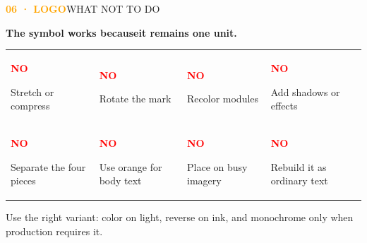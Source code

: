 \documentclass[a4paper,10pt]{article}
\newcommand{\PageLabel}[2]{\noindent\textcolor{orange}{\footnotesize\bfseries #1}\hfill\textcolor{ink!55}{\footnotesize #2}\par\vspace{5mm}}
\newcommand{\Title}[1]{{\displayfont\bfseries\fontsize{34}{38}\selectfont\color{ink}#1\par}}
\newcommand{\Sub}[1]{{\fontsize{13}{19}\selectfont\color{ink!75}#1\par}}
\begin{document}
\PageLabel{06 · LOGO}{WHAT NOT TO DO}
\Title{The symbol works because\newline it remains one unit.}
\vspace{8mm}
\begin{tabularx}{\textwidth}{@{}Y Y Y Y@{}}
\begin{card}\textcolor{red}{\bfseries NO}\par\small Stretch or compress\end{card}&
\begin{card}\textcolor{red}{\bfseries NO}\par\small Rotate the mark\end{card}&
\begin{card}\textcolor{red}{\bfseries NO}\par\small Recolor modules\end{card}&
\begin{card}\textcolor{red}{\bfseries NO}\par\small Add shadows or effects\end{card}\\[5mm]
\begin{card}\textcolor{red}{\bfseries NO}\par\small Separate the four pieces\end{card}&
\begin{card}\textcolor{red}{\bfseries NO}\par\small Use orange for body text\end{card}&
\begin{card}\textcolor{red}{\bfseries NO}\par\small Place on busy imagery\end{card}&
\begin{card}\textcolor{red}{\bfseries NO}\par\small Rebuild it as ordinary text\end{card}
\end{tabularx}
\vfill\Sub{Use the right variant: color on light, reverse on ink, and monochrome only when production requires it.}\newpage
\end{document}
